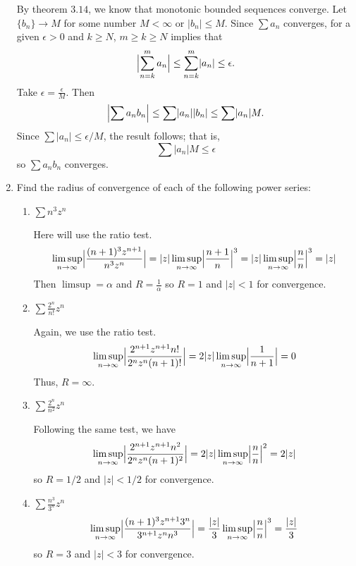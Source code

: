 \begin{enumerate}
  By theorem \(3.14\), we know that monotonic bounded sequences converge.
  Let \(\{b_n\}\to M\) for some number \(M < \infty\) or
  \(\lvert b_n\rvert\leq M\).
  Since \(\sum a_n\) converges, for a given \(\epsilon > 0\) and \(k\geq N\),
  \(m\geq k\geq N\) implies that
  \[
  \Bigl\lvert\sum_{n = k}^ma_n\Bigr\rvert\leq\sum_{n = k}^m\lvert a_n\rvert\leq
  \epsilon.
  \]
  Take \(\epsilon = \frac{\epsilon}{M}\).
  Then
  \[
  \Bigl\lvert\sum a_nb_n\Bigr\rvert\leq\sum\lvert a_n\rvert\lvert b_n\rvert\leq
  \sum\lvert a_n\rvert M.
  \]
  Since \(\sum\lvert a_n\rvert\leq\epsilon/M\), the result follows; that is,
  \[
  \sum\lvert a_n\rvert M\leq\epsilon
  \]
  so \(\sum a_nb_n\) converges.
\item
  Find the radius of convergence of each of the following power series:
  \begin{enumerate}[label = (\alph*)]
  \item
    \(\sum n^3z^n\)
    \par\smallskip
    Here will use the ratio test.
    \[
    \limsup_{n\to\infty}\Bigl\lvert\frac{(n + 1)^3z^{n + 1}}{n^3z^n}\Bigr\rvert
    = \lvert z\rvert\limsup_{n\to\infty}\Bigl\lvert\frac{n + 1}{n}\Bigr\rvert^3
    = \lvert z\rvert\limsup_{n\to\infty}\Bigl\lvert\frac{n}{n}\Bigr\rvert^3 =
    \lvert z\rvert
    \]
    Then \(\limsup = \alpha\) and \(R = \frac{1}{\alpha}\) so \(R = 1\) and
    \(\lvert z\rvert < 1\) for convergence.
  \item
    \(\sum\frac{2^n}{n!}z^n\)
    \par\smallskip
    Again, we use the ratio test.
    \[
    \limsup_{n\to\infty}\Bigl\lvert
    \frac{2^{n + 1}z^{n + 1}n!}{2^nz^n(n + 1)!}\Bigr\rvert =
    2\lvert z\rvert\limsup_{n\to\infty}\Bigl\lvert\frac{1}{n + 1}\Bigr\rvert =
    0
    \]
    Thus, \(R = \infty\).
  \item
    \(\sum\frac{2^n}{n^2}z^n\)
    \par\smallskip
    Following the same test, we have
    \[
    \limsup_{n\to\infty}\Bigl\lvert
    \frac{2^{n + 1}z^{n + 1}n^2}{2^nz^n(n + 1)^2}\Bigr\rvert =
    2\lvert z\rvert\limsup_{n\to\infty}\Bigl\lvert\frac{n}{n}\Bigr\rvert^2 =
    2\lvert z\rvert
    \]
    so \(R = 1/2\) and \(\lvert z\rvert < 1/2\) for convergence.
  \item
    \(\sum\frac{n^3}{3^n}z^n\)
    \[
    \limsup_{n\to\infty}\Bigl\lvert
    \frac{(n + 1)^3z^{n + 1}3^n}{3^{n + 1}z^nn^3}\Bigr\rvert =
    \frac{\lvert z\rvert}{3}
    \limsup_{n\to\infty}\Bigl\lvert\frac{n}{n}\Bigr\rvert^3 =
    \frac{\lvert z\rvert}{3}
    \]
    so \(R = 3\) and \(\lvert z\rvert < 3\) for convergence.

\end{enumerate}
\end{enumerate}

